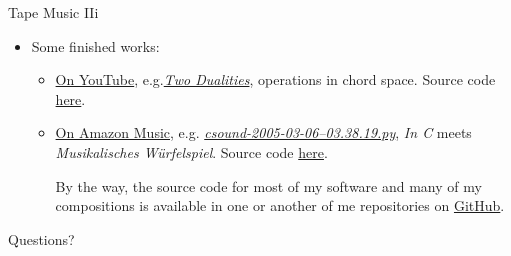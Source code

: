\documentclass{beamer}
\begin{document}
\begin{frame}{Tape Music IIi}

\begin{itemize}
\item Some finished works: 
\begin{itemize}
\item \href{https://www.youtube.com/@michaelgogins}{On YouTube}, e.g.\href{https://music.youtube.com/watch?v=3_ahbL44p-E&si=2ScceuKnI0Pqye5G}{\emph{Two Dualities}}, operations in chord space. Source code \href{xxx}{here}.
\item \href{https://music.amazon.com/artists/B0016KQMPA/michael-gogins}{On Amazon Music}, e.g. \href{https://music.amazon.com/albums/B0016UPQRK?trackAsin=B0016UGIW2\&do=play\&ref=dm_sh_26UFIwpvtSDIIQmF2rIxH1qXC}{\emph{csound-2005-03-06--03.38.19.py}}, \emph{In C} meets \emph{Musikalisches Würfelspiel}. Source code \href{xxx}{here}.

By the way, the source code for most of my software and many of my compositions is available in one or another of me repositories on \href{https://github.com/gogins}{GitHub}.

\end{itemize}
\end{itemize}

\end{frame}

\begin{frame}{Questions?}

\end{frame}
\end{document}
